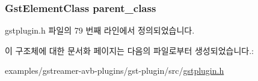 \subsubsection[{\texorpdfstring{parent\+\_\+class}{parent_class}}]{\setlength{\rightskip}{0pt plus 5cm}Gst\+Element\+Class parent\+\_\+class}\hypertarget{struct___gst_plugin_template_class_aa90acadd5b3a6279a72c08fd7f6ce60a}{}\label{struct___gst_plugin_template_class_aa90acadd5b3a6279a72c08fd7f6ce60a}


gstplugin.\+h 파일의 79 번째 라인에서 정의되었습니다.



이 구조체에 대한 문서화 페이지는 다음의 파일로부터 생성되었습니다.\+:\begin{DoxyCompactItemize}
\item 
examples/gstreamer-\/avb-\/plugins/gst-\/plugin/src/\hyperlink{gstplugin_8h}{gstplugin.\+h}\end{DoxyCompactItemize}
